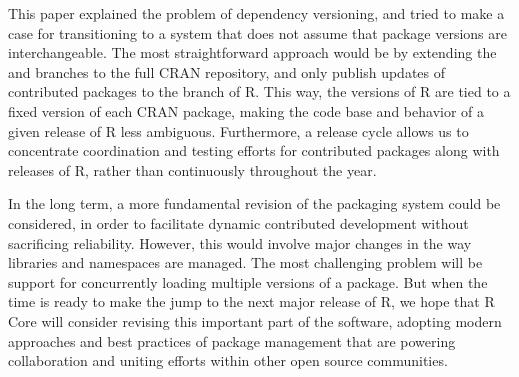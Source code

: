 This paper explained the problem of dependency versioning, and tried to make
a case for transitioning to a system that does not assume that package versions
are interchangeable. The most straightforward approach would be by extending
the  and  branches to the full CRAN repository, and
only publish updates of contributed packages to the 
branch of R. This way, the  versions of R are tied to a fixed
version of each CRAN package, making the code base and behavior of a
given release of R less ambiguous. Furthermore, a release cycle allows us
to concentrate coordination and testing efforts for contributed packages along
with releases of R, rather than continuously throughout the year.

In the long term, a more fundamental revision of the packaging system could be
considered, in order to facilitate dynamic contributed development without
sacrificing reliability. However, this would involve major changes in the way
libraries and namespaces are managed. The most challenging problem will be
support for concurrently loading multiple versions of a package. 
But when the time is ready to make the jump to the next major release of R, we
hope that R Core will consider revising this important part of the software,
adopting modern approaches and best practices of package management that are
powering collaboration and uniting efforts within other open source communities.



 
